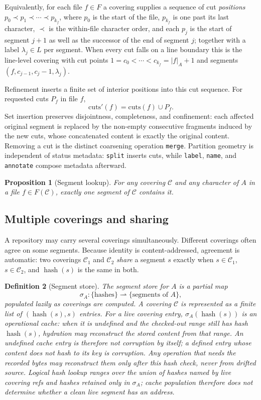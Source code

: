 \documentclass[11pt,a4paper]{article}
\newtheorem{definition}{Definition}[section]
\newtheorem{proposition}[definition]{Proposition}
\DeclareMathOperator{\hash}{hash}
\newcommand{\Cov}{\mathcal{C}}
\begin{document}
Equivalently, for each file $f \in F$ a covering supplies a sequence
of cut \emph{positions} $p_0 \prec p_1 \prec \cdots \prec p_{k_f}$,
where $p_0$ is the start of the file, $p_{k_f}$ is one past its last
character, $\prec$ is the within-file character order, and each
$p_{j}$ is the start of segment $j+1$ as well as the successor of the
end of segment $j$; together with a label $\lambda_j \in L$ per segment.
When every cut falls on a line boundary this is the line-level
covering with cut points $1 = c_0 < \cdots < c_{k_f} = |f|_A + 1$ and
segments $(f, c_{j-1}, c_j - 1, \lambda_j)$.

Refinement inserts a finite set of interior positions into this cut
sequence. For requested cuts $P_f$ in file $f$,
\[
  \mathrm{cuts}'(f) = \mathrm{cuts}(f) \cup P_f.
\]
Set insertion preserves disjointness, completeness, and confinement:
each affected original segment is replaced by the non-empty consecutive
fragments induced by the new cuts, whose concatenated content is exactly
the original content. Removing a cut is the distinct coarsening operation
\texttt{merge}. Partition geometry is independent of status metadata:
\texttt{split} inserts cuts, while \texttt{label}, \texttt{name}, and
\texttt{annotate} compose metadata afterward.

\begin{proposition}[Segment lookup]\label{prop:lookup}
For any covering $\Cov$ and any character of $A$ in a file
$f \in F(\Cov)$, exactly one segment of $\Cov$ contains it.
\end{proposition}

\subsection{Multiple coverings and sharing}\label{sec:sharing}

A repository may carry several coverings simultaneously. Different
coverings often agree on some segments. Because identity is
content-addressed, agreement is automatic: two coverings $\Cov_1$ and
$\Cov_2$ \emph{share} a segment $s$ exactly when $s \in \Cov_1$,
$s \in \Cov_2$, and $\hash(s)$ is the same in both.

\begin{definition}[Segment store]\label{def:store}
The \emph{segment store} for $A$ is a partial map
\[
  \sigma_A : \{\text{hashes}\} \rightharpoonup \{\text{segments of } A\},
\]
populated lazily as coverings are computed. A covering $\Cov$ is
represented as a finite list of $(\hash(s), s)$ entries. For a live covering
entry, $\sigma_A(\hash(s))$ is an operational cache: when it is undefined and
the checked-out range still has hash $\hash(s)$, \emph{hydration} may
reconstruct the stored content from that range. An undefined cache entry is
therefore not corruption by itself; a defined entry whose content does not
hash to its key is corruption. Any operation that needs the recorded bytes
may reconstruct them only after this hash check, never from drifted source.
Logical hash lookup ranges over the union of hashes named by live covering
refs and hashes retained only in $\sigma_A$; cache population therefore does
not determine whether a clean live segment has an address.
\end{definition}
\end{document}
